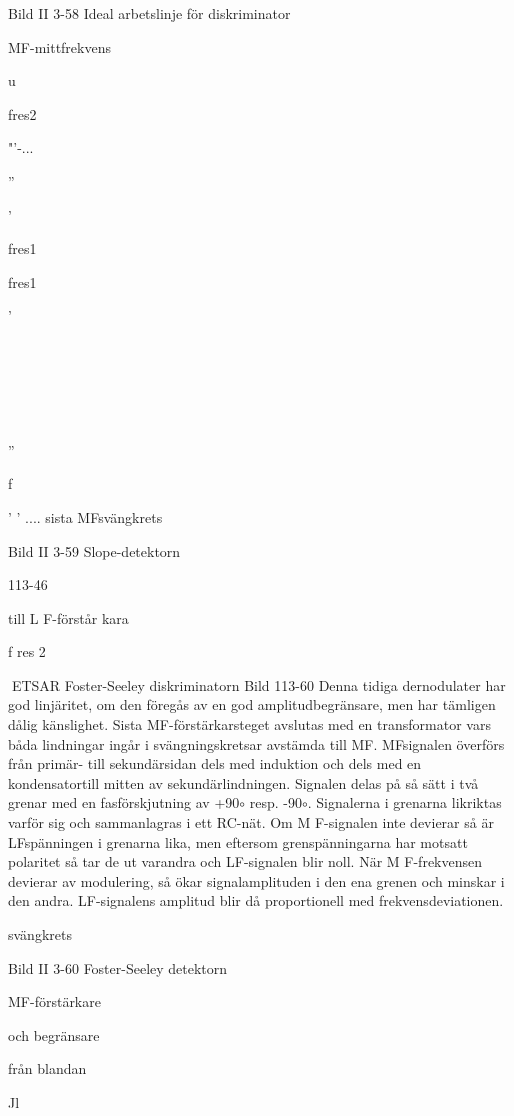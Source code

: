 {{{Bild II 3-58 Ideal arbetslinje för diskriminator

MF-mittfrekvens

u

fres2

"'-...

''

'\

fres1

fres1

'

\

\

\

''

f

' ' ....
sista MFsvängkrets

Bild II 3-59 Slope-detektorn

113-46

till
L F-förstår kara

f res 2

ETSAR
Foster-Seeley diskriminatorn
Bild 113-60
Denna tidiga dernodulater har god linjäritet,
om den föregås av en god amplitudbegränsare, men har tämligen dålig känslighet.
Sista MF-förstärkarsteget avslutas med
en transformator vars båda lindningar ingår
i svängningskretsar avstämda till MF. MFsignalen överförs från primär- till sekundärsidan dels med induktion och dels med en
kondensatortill mitten av sekundärlindningen. Signalen delas på så sätt i två grenar
med en fasförskjutning av +90\(\circ\) resp. -90\(\circ\).
Signalerna i grenarna likriktas varför sig och
sammanlagras i ett RC-nät.
Om M F-signalen inte devierar så är LFspänningen i grenarna lika, men eftersom
grenspänningarna har motsatt polaritet så
tar de ut varandra och LF-signalen blir noll.
När M F-frekvensen devierar av modulering,
så ökar signalamplituden i den ena grenen
och minskar i den andra. LF-signalens amplitud blir då proportionell med frekvensdeviationen.

svängkrets

Bild II 3-60 Foster-Seeley detektorn

MF-förstärkare

och begränsare

från blandan~

Jl

}}}
